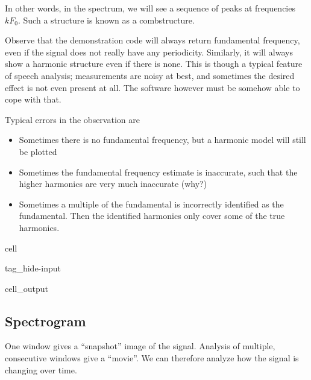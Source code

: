 \documentclass[letterpaper,10pt,english]{jupyterBook}
\begin{document}
\sphinxAtStartPar
In other words, in the spectrum, we will see a sequence of peaks at frequencies \(kF_0\). Such a structure is known as a comb\sphinxhyphen{}structure.

\sphinxAtStartPar
Observe that the demonstration code will always return  fundamental frequency, even if the signal does not really have any periodicity. Similarly, it will always show a harmonic structure even if there is none. This is though a typical feature of speech analysis; measurements are noisy at best, and sometimes the desired effect is not even present at all. The software however must be somehow able to cope with that.

\sphinxAtStartPar
Typical errors in the observation are
\begin{itemize}
\item {} 
\sphinxAtStartPar
Sometimes there is no fundamental frequency, but a harmonic model will still be plotted

\item {} 
\sphinxAtStartPar
Sometimes the fundamental frequency estimate is inaccurate, such that the higher harmonics are very much inaccurate (why?)

\item {} 
\sphinxAtStartPar
Sometimes a multiple of the fundamental is incorrectly identified as the fundamental. Then the identified harmonics only cover some of the true harmonics.

\end{itemize}

\begin{sphinxuseclass}{cell}
\begin{sphinxuseclass}{tag_hide-input}\begin{sphinxVerbatimOutput}

\begin{sphinxuseclass}{cell_output}
\noindent{}

\end{sphinxuseclass}\end{sphinxVerbatimOutput}

\end{sphinxuseclass}
\end{sphinxuseclass}

\subsection{Spectrogram}
\label{\detokenize{Representations/Short-time_analysis:spectrogram}}
\sphinxAtStartPar
One window gives a “snapshot” image of the signal.
Analysis of multiple, consecutive windows give a “movie”. We can therefore analyze how the signal is changing over time.
\end{document}
